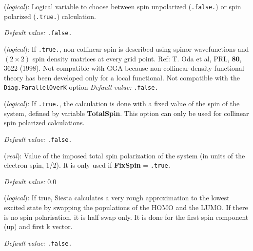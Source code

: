 \documentclass[11pt]{article}
\begin{document}
\begin{description}
\itemsep 10pt
\parsep 0pt

\item[{\bf SpinPolarized}] ({\it logical}): 
Logical variable to choose between spin unpolarized ({\tt .false.}) 
or spin polarized ({\tt .true.}) calculation.

{\it Default value:} {\tt .false.}


\item[{\bf NonCollinearSpin}] ({\it logical}): 
If {\tt .true.}, non-collinear spin is described using spinor wavefunctions
and $(2 \times 2)$ spin density matrices at every grid point.
Ref: T. Oda et al, PRL, {\bf 80}, 3622 (1998).
Not compatible with GGA because non-collinear density functional
theory has been developed only for a local functional.
Not compatible with the {\tt Diag.ParallelOverK} option
{\it Default value:} {\tt .false.}


\item[{\bf FixSpin}] ({\it logical}): 
If {\tt .true.}, the calculation is done with a fixed value of the
spin of the system, defined by variable  {\bf TotalSpin}.
This option can only be used for collinear spin polarized
calculations.

{\it Default value:} {\tt .false.}

\item[{\bf TotalSpin}] ({\it real}):
Value of the imposed total spin polarization of the system (in units of the
electron spin, 1/2). It is only used
if {\bf FixSpin} = {\tt .true.}

{\it Default value:} 0.0

\item[{\bf SingleExcitation}] ({\it logical}):
If true, {\sc Siesta} calculates a very rough approximation to 
the lowest excited state by swapping the populations of the HOMO 
and the LUMO. If there is no spin polarisation, it is half swap only. 
It is done for the first spin component (up) and first k vector.

{\it Default value:} {\tt .false.}


\end{description}
\end{document}
